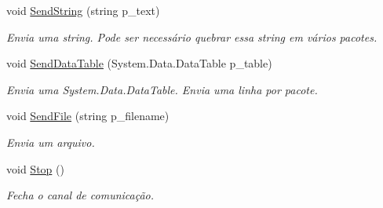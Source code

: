 \begin{DoxyCompactItemize}
void \hyperlink{classSpartacus_1_1Net_1_1Endpoint_a17c745276c7becd11fd2b5a20727c1b0}{Send\+String} (string p\+\_\+text)
\begin{DoxyCompactList}\small\item\em Envia uma string. Pode ser necessário quebrar essa string em vários pacotes. \end{DoxyCompactList}\item 
void \hyperlink{classSpartacus_1_1Net_1_1Endpoint_ae84bb9413905f423f0c1589f74b0e652}{Send\+Data\+Table} (System.\+Data.\+Data\+Table p\+\_\+table)
\begin{DoxyCompactList}\small\item\em Envia uma System.\+Data.\+Data\+Table. Envia uma linha por pacote. \end{DoxyCompactList}\item 
void \hyperlink{classSpartacus_1_1Net_1_1Endpoint_a6ad0e0169c4d3d153a970c2af3241d06}{Send\+File} (string p\+\_\+filename)
\begin{DoxyCompactList}\small\item\em Envia um arquivo. \end{DoxyCompactList}\item 
void \hyperlink{classSpartacus_1_1Net_1_1Endpoint_aeb5926e65be9a1bf048211fe39c8a09d}{Stop} ()
\begin{DoxyCompactList}\small\item\em Fecha o canal de comunicação. \end{DoxyCompactList}\end{DoxyCompactItemize}
